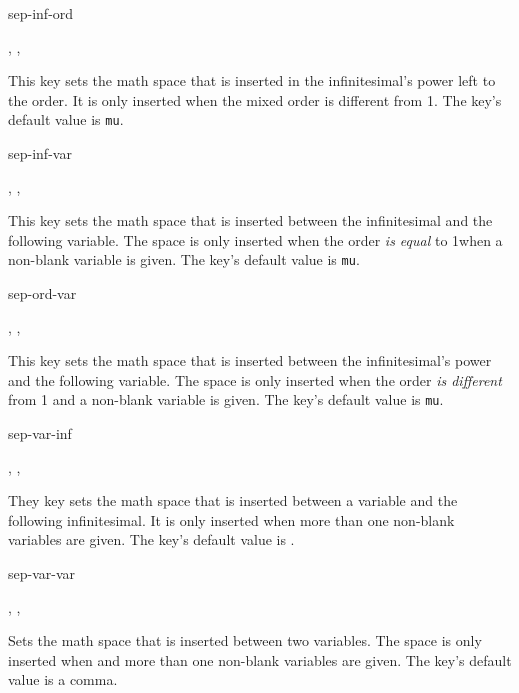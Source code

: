 	\begin{option}{sep-inf-ord}
		\begin{values}[default = 0]
			, , 
		\end{values}
		This key sets the math space that is inserted in the infinitesimal's power left to the order. It is only inserted when the mixed order is different from \num{1}. The key's default value is  \texttt{mu}.
	\end{option}
	
	\begin{option}{sep-inf-var}
		\begin{values}[default = 0]
			, , 
		\end{values}
		This key sets the math space that is inserted between the infinitesimal and the following variable. The space is only inserted when the order \emph{is equal} to \num{1}when a non-blank variable is given. The key's default value is  \texttt{mu}.
	\end{option}
	
	\begin{option}{sep-ord-var}
		\begin{values}[default = 0]
			, , 
		\end{values}
		This key sets the math space that is inserted between the infinitesimal's power and the following variable. The space is only inserted when the order \emph{is different} from \num{1} and a non-blank variable is given. The key's default value is  \texttt{mu}.
	\end{option}
	
	\clearpage
	
	\begin{option}{sep-var-inf}
		\begin{values}[default = \cs{mathop}\{\}\cs{!}]
			, , 
		\end{values}
		They key sets the math space that is inserted between a variable and the following infinitesimal. It is only inserted when more than one non-blank variables are given. The key's default value is .
	\end{option}
	
	\begin{option}{sep-var-var}
		\begin{values}[default = {{,}}]
			, , 
		\end{values}
		Sets the math space that is inserted between two variables. The space is only inserted when  and more than one non-blank variables are given. The key's default value is a comma.
	\end{option}
	
